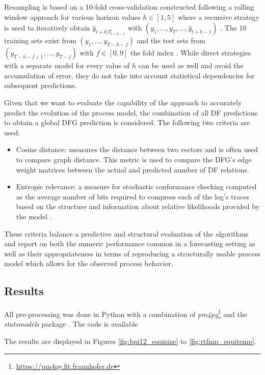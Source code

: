 Resampling is based on a 10-fold cross-validation constructed following a rolling window approach for various horizon values $h\in[1,5]$ where a recursive strategy is used to iteratively obtain $\hat{y}_{t+h|T_{t+h-1}}$ with $(y_1,\dots,y_{T},\dots,\hat{y}_{t+h-1})$ \cite{weigend2018time}.
The 10 training sets exist from $(y_1,\dots,y_{T-h-f})$ and the test sets from\\ $(y_{T-h-f+1},\dots,y_{T-f})$ with $f\in[0,9]$ the fold index \cite{bergmeir2012use}.
While direct strategies with a separate model for every value of $h$ can be used as well and avoid the accumulation of error, they do not take into account statistical dependencies for subsequent predictions.

Given that we want to evaluate the capability of the approach to accurately predict the evolution of the process model, the combination of all DF predictions to obtain a global DFG prediction is considered.
The following two criteria are used:
\begin{itemize}
	\item Cosine distance: measures the distance between two vectors and is often used to compare graph distance. This metric is used to compare the DFG's edge weight matrices between the actual and predicted number of DF relations.
	\item Entropic relevance: a measure for stochastic conformance checking computed as the average number of bits required to compress each of the log’s traces based on the structure and information about relative likelihoods provided by the model \cite{DBLP:conf/icpm/PolyvyanyyMG20}.
\end{itemize}
These criteria balance a predictive and structural evaluation of the algorithms and report on both the numeric performance common in a forecasting setting as well as their appropriateness in terms of reproducing a structurally usable process model which allows for the observed process behavior.

\subsection{Results}
All pre-processing was done in Python with a combination of \emph{pm4py}\footnote{\url{https://pm4py.fit.fraunhofer.de}} and the \emph{statsmodels} package \cite{seabold2010statsmodels}. 
The code is available %

The results are displayed in Figures \ref{fig:bpi12_equisize} to \ref{fig:rtfmp_equitemp}.

